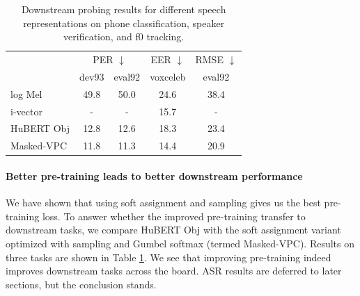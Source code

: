 %
%
%
%
%
%
%
%
%
%
%
%

%
%
%
%
%
%
%

%
%
%
%
%

\begin{table}
    \caption{Downstream probing results for different speech representations
        on phone classification, speaker verification, and f0 tracking.}
    \label{tab:downstream1}
    \centering
    \footnotesize
    \begin{tabularx}{0.98\linewidth}{lcccc}
            \toprule
                    &\multicolumn{2}{c}{PER $\downarrow$} &EER $\downarrow$ &RMSE $\downarrow$  \\
                    &dev93 &eval92 &voxceleb &eval92  \\[1pt]
            \midrule
            log Mel       &49.8          &50.0       &24.6        &38.4 \\
            i-vector      &-             &-          &15.7        &-    \\
            HuBERT Obj            &12.8          &12.6          &18.3      &23.4  \\
            Masked-VPC        &11.8          &11.3          &14.4      &20.9  \\
            \bottomrule
    \end{tabularx}
\end{table}

\paragraph{Better pre-training leads to better downstream performance}

We have shown that using soft assignment and sampling gives us the best pre-training loss.
To answer whether the improved pre-training transfer to downstream tasks,
we compare HuBERT Obj with the soft assignment variant optimized with sampling and Gumbel softmax (termed Masked-VPC).
Results on three tasks are shown in Table \ref{tab:downstream1}.
We see that improving pre-training indeed improves downstream tasks across the board.
ASR results are deferred to later sections, but the conclusion stands.

%
%
%
%
%
%
%
%
%


